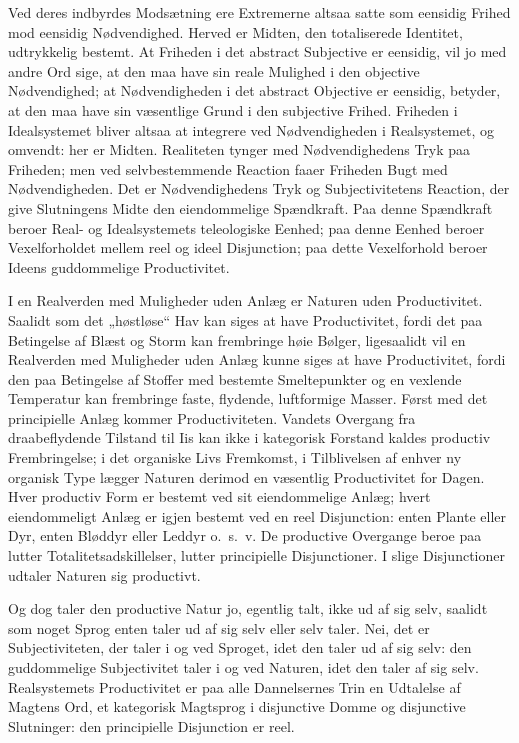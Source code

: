 \documentclass[12pt]{book}
\newcommand{\opage}[1]{\marginnote{\footnotesize\textit{[#1]}}}
\begin{document}
Ved deres indbyrdes Modsætning ere Extremerne altsaa satte som eensidig Frihed mod eensidig Nødvendighed. Herved er Midten, den totaliserede Identitet, udtrykkelig bestemt. At Friheden i det abstract Subjective er eensidig, vil jo med andre Ord sige, at den maa have sin reale Mulighed i den objective Nødvendighed; at Nødvendigheden i det abstract Objective er eensidig, betyder, at den maa have sin væsentlige Grund i den subjective Frihed. Friheden i Idealsystemet bliver altsaa at integrere ved Nødvendigheden i Realsystemet, og omvendt: her er Midten. Realiteten tynger med Nødvendighedens Tryk paa Friheden; men ved selvbestemmende Reaction faaer Friheden Bugt med Nødvendigheden. Det er Nødvendighedens Tryk og Subjectivitetens Reaction, der give Slutningens Midte den eiendommelige Spændkraft. Paa denne Spændkraft beroer Real- og Idealsystemets teleologiske Eenhed; paa denne Eenhed beroer Vexelforholdet mellem reel og ideel Disjunction; paa dette Vexelforhold beroer Ideens guddommelige Productivitet.

\opage{443}I en Realverden med Muligheder uden Anlæg er Naturen uden Productivitet. Saalidt som det „høstløse“ Hav kan siges at have Productivitet, fordi det paa Betingelse af Blæst og Storm kan frembringe høie Bølger, ligesaalidt vil en Realverden med Muligheder uden Anlæg kunne siges at have Productivitet, fordi den paa Betingelse af Stoffer med bestemte Smeltepunkter og en vexlende Temperatur kan frembringe faste, flydende, luftformige Masser. Først med det principielle Anlæg kommer Productiviteten. Vandets Overgang fra draabeflydende Tilstand til Iis kan ikke i kategorisk Forstand kaldes productiv Frembringelse; i det organiske Livs Fremkomst, i Tilblivelsen af enhver ny organisk Type lægger Naturen derimod en væsentlig Productivitet for Dagen. Hver productiv Form er bestemt ved sit eiendommelige Anlæg; hvert eiendommeligt Anlæg er igjen bestemt ved en reel Disjunction: enten Plante eller Dyr, enten Bløddyr eller Leddyr o.\ s.\ v. De productive Overgange beroe paa lutter Totalitetsadskillelser, lutter principielle Disjunctioner. I slige Disjunctioner udtaler Naturen sig productivt.

Og dog taler den productive Natur jo, egentlig talt, ikke ud af sig selv, saalidt som noget Sprog enten taler ud af sig selv eller selv taler. Nei, det er Subjectiviteten, der taler i og ved Sproget, idet den taler ud af sig selv: den guddommelige Subjectivitet taler i og ved Naturen, idet den taler af sig selv. Realsystemets Productivitet er paa alle Dannelsernes Trin en Udtalelse af Magtens Ord, et kategorisk Magtsprog i disjunctive Domme og disjunctive Slutninger: den principielle Disjunction er reel.
\end{document}
